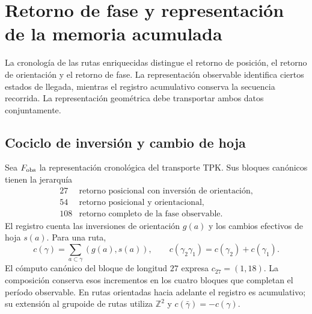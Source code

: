 
\section{Retorno de fase y representación de la memoria acumulada}
\label{vii:sec:retorno-memoria-gravedad}

La cronología de las rutas enriquecidas distingue el retorno de posición,
el retorno de orientación y el retorno de fase. La representación observable
identifica ciertos estados de llegada, mientras el registro acumulativo
conserva la secuencia recorrida. La representación geométrica debe
transportar ambos datos conjuntamente.

\subsection{Cociclo de inversión y cambio de hoja}
\label{vii:subsec:cociclo-memoria}

Sea \(F_{\rm obs}\) la representación cronológica del transporte TPK.
Sus bloques canónicos tienen la jerarquía
\[
\begin{array}{c|l}
27&\text{retorno posicional con inversión de orientación},\\
54&\text{retorno posicional y orientacional},\\
108&\text{retorno completo de la fase observable}.
\end{array}
\]
El registro cuenta las inversiones de orientación \(g(a)\) y los
cambios efectivos de hoja \(s(a)\). Para una ruta,
\begin{equation}
 c(\gamma)=\sum_{a\subset\gamma}(g(a),s(a)),\qquad
 c(\gamma_2\gamma_1)=c(\gamma_2)+c(\gamma_1).
 \label{vii:eq:cociclo-ruta}
\end{equation}
El cómputo canónico del bloque de longitud \(27\) expresa
\(c_{27}=(1,18)\). La composición conserva esos incrementos en
los cuatro bloques que completan el período observable.
En rutas orientadas hacia adelante el registro es acumulativo;
su extensión al grupoide de rutas utiliza \(\mathbb Z^2\) y
\(c(\bar\gamma)=-c(\gamma)\).

